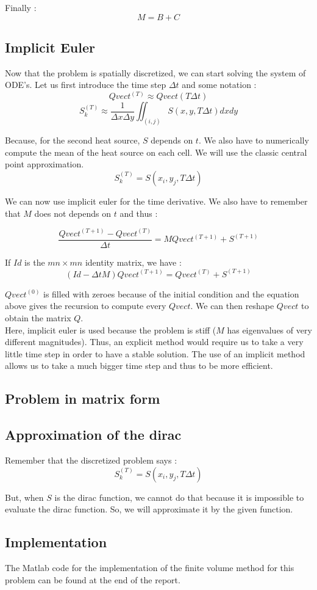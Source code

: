 Finally : 
$$M = B + C$$

\subsection{Implicit Euler}

Now that the problem is spatially discretized, we can start solving the system of ODE's. Let us first introduce the time step $\Delta t$ and some notation :
$$Qvect^{(T)} \approx Qvect(T\Delta t)$$
$$S_k^{(T)} \approx \frac{1}{\Delta x \Delta y}\iint_{(i,j)} S(x,y,T\Delta t)dxdy$$

Because, for the second heat source, $S$ depends on $t$. We also have to numerically compute the mean of the heat source on each cell. We will use the classic central point approximation. 
$$S_k^{(T)} = S(x_i,y_j,T\Delta t)$$

We can now use implicit euler for the time derivative. We also have to remember that $M$ does not depends on $t$ and thus :

$$\frac{Qvect^{(T+1)}-Qvect^{(T)}}{\Delta t} = MQvect^{(T+1)} + S^{(T+1)}$$

If $Id$ is the $mn\times mn$ identity matrix, we have :
$$(Id-\Delta t M)Qvect^{(T+1)} = Qvect^{(T)} + S^{(T+1)}$$

$Qvect^{(0)}$ is filled with zeroes because of the initial condition and the equation above gives the recursion to compute every $Qvect$. We can then reshape $Qvect$ to obtain the matrix $Q$. \\


Here, implicit euler is used because the problem is stiff ($M$ has eigenvalues of very different magnitudes). Thus, an explicit method would require us to take a very little time step in order to have a stable solution. The use of an implicit method allows us to take a much bigger time step and thus to be more efficient.

\subsection{Problem in matrix form}


\subsection{Approximation of the dirac}
Remember that the discretized problem says : 
$$S_k^{(T)} = S(x_i,y_j,T\Delta t)$$

But, when $S$ is the dirac function, we cannot do that because it is impossible to evaluate the dirac function. So, we will approximate it by the given function.

\subsection{Implementation}
The Matlab code for the implementation of the finite volume method for this problem can be found at the end of the report.

